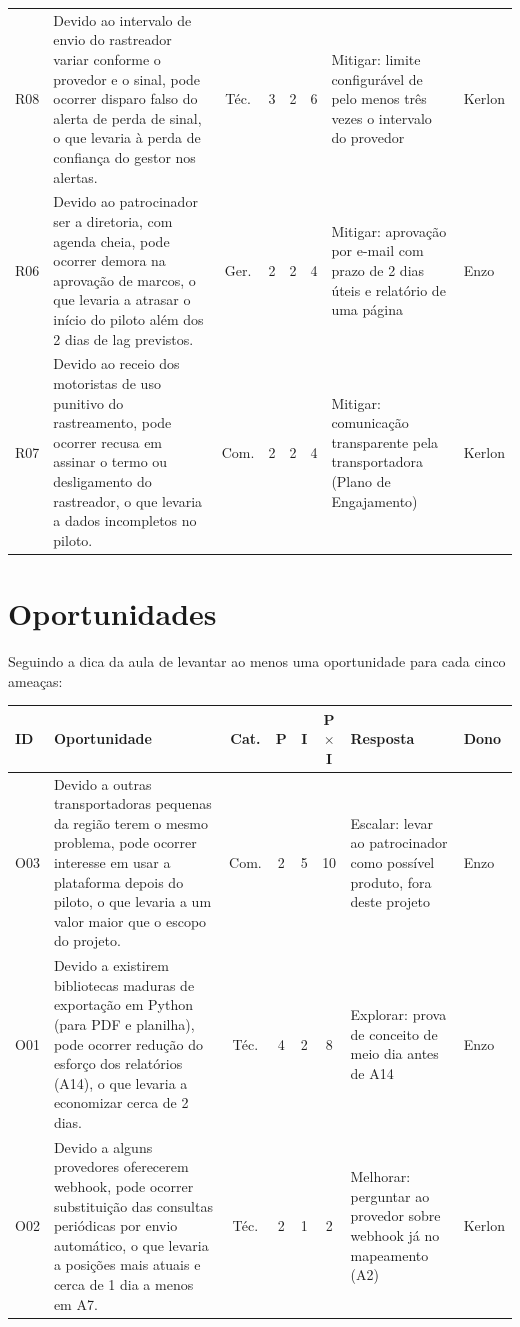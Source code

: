 \documentclass[11pt,a4paper]{article}
\begin{document}
{\begin{xltabular}{\textwidth}{l L c c c c >{\raggedright\arraybackslash}p{3.4cm} l}
\addlinespace
R08 & Devido ao intervalo de envio do rastreador variar conforme o provedor e o sinal, pode ocorrer disparo falso do alerta de perda de sinal, o que levaria à perda de confiança do gestor nos alertas. & Téc. & 3 & 2 & 6 & Mitigar: limite configurável de pelo menos três vezes o intervalo do provedor & Kerlon \\
\addlinespace
R06 & Devido ao patrocinador ser a diretoria, com agenda cheia, pode ocorrer demora na aprovação de marcos, o que levaria a atrasar o início do piloto além dos 2 dias de lag previstos. & Ger. & 2 & 2 & 4 & Mitigar: aprovação por e-mail com prazo de 2 dias úteis e relatório de uma página & Enzo \\
\addlinespace
R07 & Devido ao receio dos motoristas de uso punitivo do rastreamento, pode ocorrer recusa em assinar o termo ou desligamento do rastreador, o que levaria a dados incompletos no piloto. & Com. & 2 & 2 & 4 & Mitigar: comunicação transparente pela transportadora (Plano de Engajamento) & Kerlon \\
\bottomrule
\end{xltabular}
}

\section{Oportunidades}
Seguindo a dica da aula de levantar ao menos uma oportunidade para cada cinco ameaças:

{\small
\begin{xltabular}{\textwidth}{l L c c c c >{\raggedright\arraybackslash}p{3.4cm} l}
\toprule
\textbf{ID} & \textbf{Oportunidade} & \textbf{Cat.} & \textbf{P} & \textbf{I} & \textbf{P$\times$I} & \textbf{Resposta} & \textbf{Dono} \\
\midrule
\endhead
O03 & Devido a outras transportadoras pequenas da região terem o mesmo problema, pode ocorrer interesse em usar a plataforma depois do piloto, o que levaria a um valor maior que o escopo do projeto. & Com. & 2 & 5 & 10 & Escalar: levar ao patrocinador como possível produto, fora deste projeto & Enzo \\
\addlinespace
O01 & Devido a existirem bibliotecas maduras de exportação em Python (para PDF e planilha), pode ocorrer redução do esforço dos relatórios (A14), o que levaria a economizar cerca de 2 dias. & Téc. & 4 & 2 & 8 & Explorar: prova de conceito de meio dia antes de A14 & Enzo \\
\addlinespace
O02 & Devido a alguns provedores oferecerem webhook, pode ocorrer substituição das consultas periódicas por envio automático, o que levaria a posições mais atuais e cerca de 1 dia a menos em A7. & Téc. & 2 & 1 & 2 & Melhorar: perguntar ao provedor sobre webhook já no mapeamento (A2) & Kerlon \\
\bottomrule
\end{xltabular}
}
\end{document}
